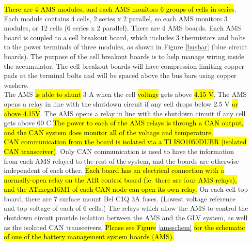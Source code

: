 \documentclass{article}
\DeclareRobustCommand{\hlr}[1]{{\sethlcolor{red}\hl{#1}}}
\begin{document}


           \hlr{There are 4 AMS modules, and each AMS monitors 6 groups of cells in series}. Each module contains 4 cells, 2 series x 2 parallel, so each AMS monitors 3 modules, or 12 cells (6 series x 2 parallel). There are 4 AMS boards. Each AMS board is coupled to a cell breakout board, which includes 3 thermistors and bolts to the power terminals of three modules, as shown in Figure \ref{busbar} (blue circuit boards). The purpose of the cell breakout boards is to help manage wiring inside the accumulator. The cell breakout boards will have compression limiting copper pads at the terminal bolts and will be spaced above the bus bars using copper washers.\\

            The AMS \hlr{is able to shunt} 3 A when the cell \hlr{voltage} gets above \hlr{4.15 V}. The AMS opens a relay in line with the shutdown circuit if any cell drops below 2.5 V \hlr{or above 4.15V}. The AMS opens a relay in line with the shutdown circuit if any cell gets above 60 \degree C.\hlr{The power to each of the AMS relays is through a CAN output, and the CAN system does monitor all of the voltage and temperature.}\\

            \hlr{CAN communication from the board is isolated via a TI ISO1050DUBR (isolated CAN transceiver)}. Only CAN communication is used to have the information from each AMS relayed to the rest of the system, and the boards are otherwise independent of each other. \hlr{Each board has an electrical connection with a normally-open relay on the AIR control board (ie. there are four AMS relays), and the ATmega16M1 of each CAN node can open its own relay.} On each cell-top board, there are 7 surface mount Bel C1Q 3A fuses. (Lowest voltage reference and top voltage of each of 6 cells.) The relays which allow the AMS to control the shutdown circuit provide isolation between the AMS and the GLV system, as well as the isolated CAN transceivers. \hlr{Please see Figure} \ref{amsschem} \hlr{for the schematic of one of the battery management system boards (AMS).}\\
\end{document}
